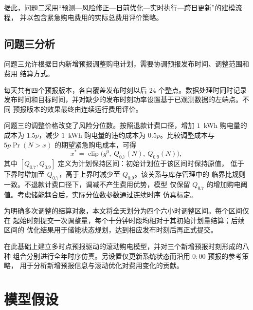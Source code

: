 \documentclass[withoutpreface,bwprint]{cumcmthesis}
\begin{document}
据此，问题二采用“预测—风险修正—日前优化—实时执行—跨日更新”的建模流程，
并以包含紧急购电费用的实际总费用评价策略。

\subsection{问题三分析}

问题三允许根据日内新增预报调整购电计划，需要协调预报发布时间、调整范围和费用
结算方式。

每天共有四个预报版本，各自覆盖发布时刻以后 $24$ 个整点。数据处理时同时记录
发布时间和目标时间，并对缺少的发布时刻功率设置基于已观测数据的左端点。不同
预报版本的效果最终由连续运行费用评价。

问题三的调整价格改变了风险分位数。按照退款计费口径，增加 $1$~kWh 购电量的
成本为 $1.5p$，减少 $1$~kWh 购电量的违约成本为 $0.5p$。比较调整成本与
$5p\Pr(N>x)$ 的期望紧急购电成本，可得
$$
x^*=\operatorname{clip}\bigl(g^0,\ Q_{0.7}(N),\ Q_{0.9}(N)\bigr),
$$
其中 $[Q_{0.7},Q_{0.9}]$ 定义为计划保持区间：初始计划位于该区间时保持原值，
低于下界时增加至 $Q_{0.7}$，高于上界时减少至 $Q_{0.9}$。该关系与库存管理中的
临界比规则一致\cite{ref:newsvendor}。不退款计费口径下，调减不产生费用优势，模型
仅保留 $Q_{0.7}$ 的增加购电阈值。考虑储能耦合后，实际分位数参数通过连续时序
仿真标定。

为明确多次调整的结算对象，本文将全天划分为四个六小时调整区间。每个区间仅在
起始时刻提交一次调整量，每个十分钟时段均相对于其初始计划量结算；后续区间的
优化结果用于储能状态规划，达到相应发布时刻后再正式提交。

在此基础上建立多时点预报驱动的滚动购电模型，并对三个新增预报时刻形成的八种
组合分别进行全年时序仿真。另设置仅更新系统状态而沿用 $0{:}00$ 预报的参考策略，
用于分析新增预报信息与滚动优化对费用变化的贡献。

\section{模型假设}
\end{document}
